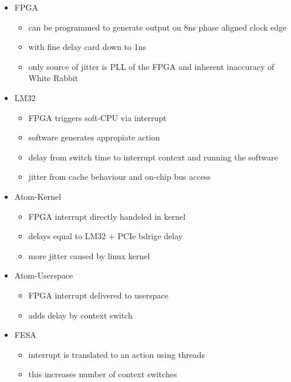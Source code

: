 \documentclass[25pt,halfparskip-,pagesize]{scrartcl}
\begin{document}
\begin{multicols*}{3}
\begin{itemize}
  \item FPGA
    \begin{itemize}
      \item can be programmed to generate output on 8ns phase aligned clock edge
      \item with fine delay card down to 1ns
      \item only source of jitter is PLL of the FPGA and inherent inaccuracy of White Rabbit
    \end{itemize}
  \item LM32
    \begin{itemize}
      \item FPGA triggers soft-CPU via interrupt
      \item software generates appropiate action
      \item delay from switch time to interrupt context and running the software
      \item jitter from cache behaviour and on-chip bus access
    \end{itemize}
  \item Atom-Kernel
    \begin{itemize}
      \item FPGA interrupt directly handeled in kernel
      \item delays equal to LM32 + PCIe bdrige delay
      \item more jitter caused by linux kernel
    \end{itemize}
  \item Atom-Userspace
    \begin{itemize}
      \item FPGA interrupt delivered to userspace
      \item adds delay by context switch 
    \end{itemize}
  \item FESA
    \begin{itemize}
      \item interrupt is translated to an action using threads
      \item this increases number of context switches
    \end{itemize}
\end{itemize}


\end{multicols*}
\end{document}
